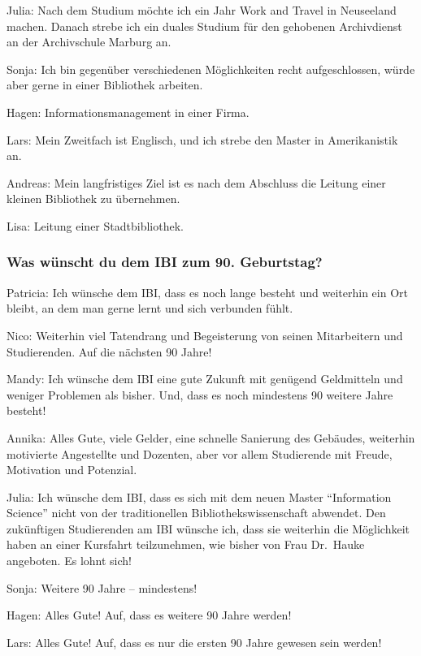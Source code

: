 \documentclass[a4paper,
fontsize=11pt,
oneside,
numbers=noperiodatend,
parskip=half-,
bibliography=totoc,
final
]{scrartcl}
\begin{document}
Julia: Nach dem Studium möchte ich ein Jahr Work and Travel in
Neuseeland machen. Danach strebe ich ein duales Studium für den
gehobenen Archivdienst an der Archivschule Marburg an.

Sonja: Ich bin gegenüber verschiedenen Möglichkeiten recht
aufgeschlossen, würde aber gerne in einer Bibliothek arbeiten.

Hagen: Informationsmanagement in einer Firma.

Lars: Mein Zweitfach ist Englisch, und ich strebe den Master in
Amerikanistik an.

Andreas: Mein langfristiges Ziel ist es nach dem Abschluss die Leitung
einer kleinen Bibliothek zu übernehmen.

Lisa: Leitung einer Stadtbibliothek.

\hypertarget{was-wuxfcnscht-du-dem-ibi-zum-90.-geburtstag}{%
\subsubsection{Was wünscht du dem IBI zum 90.
Geburtstag?}\label{was-wuxfcnscht-du-dem-ibi-zum-90.-geburtstag}}

Patricia: Ich wünsche dem IBI, dass es noch lange besteht und weiterhin
ein Ort bleibt, an dem man gerne lernt und sich verbunden fühlt.

Nico: Weiterhin viel Tatendrang und Begeisterung von seinen Mitarbeitern
und Studierenden. Auf die nächsten 90 Jahre!

Mandy: Ich wünsche dem IBI eine gute Zukunft mit genügend Geldmitteln
und weniger Problemen als bisher. Und, dass es noch mindestens 90
weitere Jahre besteht!

Annika: Alles Gute, viele Gelder, eine schnelle Sanierung des Gebäudes,
weiterhin motivierte Angestellte und Dozenten, aber vor allem
Studierende mit Freude, Motivation und Potenzial.

Julia: Ich wünsche dem IBI, dass es sich mit dem neuen Master
\enquote{Information Science} nicht von der traditionellen
Bibliothekswissenschaft abwendet. Den zukünftigen Studierenden am IBI
wünsche ich, dass sie weiterhin die Möglichkeit haben an einer Kursfahrt
teilzunehmen, wie bisher von Frau Dr.~Hauke angeboten. Es lohnt sich!

Sonja: Weitere 90 Jahre -- mindestens!

Hagen: Alles Gute! Auf, dass es weitere 90 Jahre werden!

Lars: Alles Gute! Auf, dass es nur die ersten 90 Jahre gewesen sein
werden!
\end{document}
